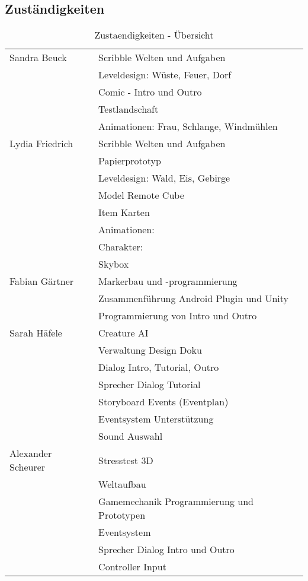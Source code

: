 \subsection{Zuständigkeiten}
\begin{table}[!htbp] %
\begin{center}
\begin{tabular}[hc]{l|l}
\hline
Sandra Beuck & Scribble Welten und Aufgaben\\
& Leveldesign: Wüste, Feuer, Dorf\\
& Comic - Intro und Outro\\
& Testlandschaft\\
& Animationen: Frau, Schlange, Windmühlen\\
\hline
Lydia Friedrich & Scribble Welten und Aufgaben\\
& Papierprototyp\\
& Leveldesign: Wald, Eis, Gebirge\\
& Model Remote Cube\\
& Item Karten\\
& Animationen:\\
& Charakter:\\
& Skybox\\
\hline
Fabian Gärtner & Markerbau und -programmierung\\
& Zusammenführung Android Plugin und Unity\\
& Programmierung von Intro und Outro\\
\hline
Sarah Häfele & Creature AI\\
& Verwaltung Design Doku\\
& Dialog Intro, Tutorial, Outro\\
& Sprecher Dialog Tutorial\\
& Storyboard Events (Eventplan)\\
& Eventsystem Unterstützung\\
& Sound Auswahl\\
\hline
Alexander Scheurer & Stresstest 3D\\
& Weltaufbau\\
& Gamemechanik Programmierung und Prototypen\\
& Eventsystem\\
& Sprecher Dialog Intro und Outro\\
& Controller Input\\
\end{tabular}
\caption{Zustaendigkeiten - Übersicht}
\label{tab:aufgaben}
\end{center}
\end{table}